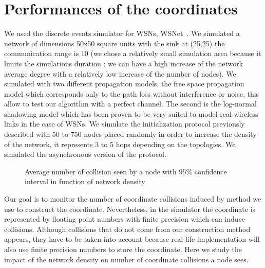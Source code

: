 \documentclass[a4paper]{article}
\begin{document}
\section{Performances of the coordinates}








We used the discrete events simulator for WSNs, WSNet~\cite{wsnet}. We simulated a network of dimensions 50x50 square units with the sink at (25,25) the communication range is 10 (we chose a relatively small simulation area because it limits the simulations duration : we can have a high increase of the network average degree with a relatively low increase of the number of nodes). We simulated with two different propagation models, the free space propagation model which corresponds only to the path loss without interference or noise, this allow to test our algorithm with a perfect channel. The second is the log-normal shadowing model which has been proven \cite{Zuniga04} to be very suited to model real wireless links in the case of WSNs. We simulate the initialization protocol previously described with 50 to 750 nodes placed randomly in order to increase the density of the network, it represents 3 to 5 hops depending on the topologies. We simulated the asynchronous version of the protocol.

\begin{figure}[!h]

    \hfil
\caption{Average number of collision seen by a node with 95\% confidence interval in function of network density}
\end{figure}

Our goal is to monitor the number of coordinate collisions induced by method we use to construct the coordinate. Nevertheless, in the simulator the coordinate is represented by floating point numbers with finite precision which can induce collisions. Although collisions that do not come from our construction method appears, they have to be taken into account because real life implementation will also use finite precision numbers to store the coordinate. Here we study the impact of the network density on number of coordinate collisions a node sees.
\end{document}
